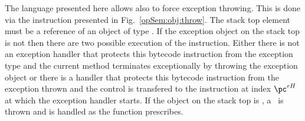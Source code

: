 \begin{figure}[ht!]
\end{figure}



The language presented here allows also to force  exception throwing. This is done via the
 instruction \athrow{} presented in Fig.\ \ref{opSem:obj:throw}.    The stack top element  must be a reference of an object of type  \Throwable. 
	 If the exception object on the stack top is not \Mynull{} then there are two possible execution of the instruction.
	  Either there is not an exception handler  that protects this bytecode instruction from the 
	  exception type and the current method \methodd{} terminates exceptionally by throwing the exception object \stackOnlyParam{\counterOnly} or
	   there is a handler that protects this bytecode instruction from the exception thrown and the control is transfered
	  to the instruction at index $\pc^{eH}$  at which the exception handler starts. %
	  If the object on the stack top is \Mynull, a \NullPointerExc \ is thrown and is handled as the function \getStateAfterExc{} prescribes. 

